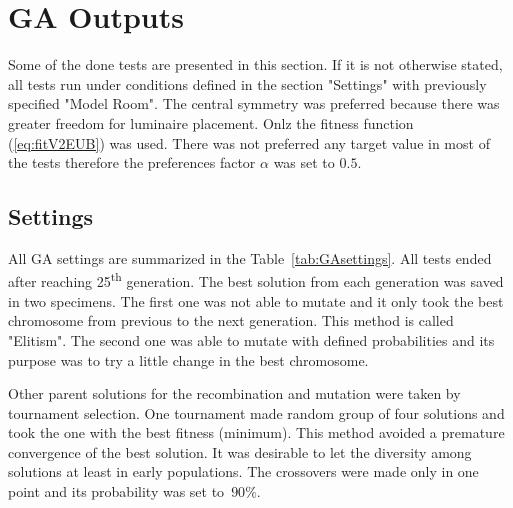 \section{GA Outputs}
Some of the done tests are presented in this section. If it is not otherwise stated, all tests run under conditions defined in the section "Settings" with previously specified "Model Room". The central symmetry was preferred because there was greater freedom for luminaire placement. Onlz the fitness function (\ref{eq:fitV2EUB}) was used. There was not preferred any target value in most of the tests therefore the preferences factor $\alpha$ was set to $0.5$.

\subsection{Settings}

All GA settings are summarized in the Table~\ref{tab:GAsettings}. All tests ended after reaching 25\textsuperscript{th} generation. The best solution from each generation was saved in two specimens. The first one was not able to mutate and it only took the best chromosome from previous to the next generation. This method is called "Elitism". The second one was able to mutate with defined probabilities and its purpose was to try a little change in the best chromosome.

Other parent solutions for the recombination and mutation were taken by tournament selection. One tournament made random group of four solutions and took the one with the best fitness (minimum). This method avoided a premature convergence of the best solution. It was desirable to let the diversity among solutions at least in early populations. The crossovers were made only in one point and its probability was set to~$90 \%$.

